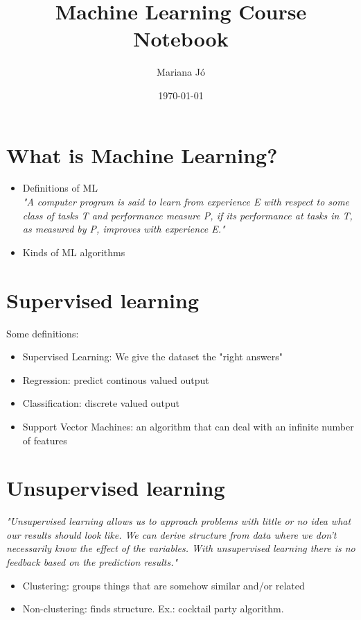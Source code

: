 \documentclass[a4paper,11pt]{article}
\title{Machine Learning Course\\\large{Notebook}}
\author{Mariana Jó}
\date{\today}
\begin{document}
  \maketitle
  \thispagestyle{fancy}


  \section{What is Machine Learning?}
  \begin{itemize}
    \item Definitions of ML \\
    \textit{"A computer program is said to learn from experience E with respect to some class of tasks T and performance measure P, if its performance at tasks in T, as measured by P, improves with experience E."}
    \item Kinds of ML algorithms
  \end{itemize}

  \section{Supervised learning}
  Some definitions:
  \begin{itemize}
    \item Supervised Learning: We give the dataset the "right answers"
    \item Regression: predict continous valued output
    \item Classification: discrete valued output
    \item Support Vector Machines: an algorithm that can deal with an infinite number of features
  \end{itemize}
  \section{Unsupervised learning}
  \textit{"Unsupervised learning allows us to approach problems with little or no idea what our results should look like. We can derive structure from data where we don't necessarily know the effect of the variables. With unsupervised learning there is no feedback based on the prediction results."}
  \begin{itemize}
    \item Clustering: groups things that are somehow similar and/or related
    \item Non-clustering: finds structure. Ex.: cocktail party algorithm.
  \end{itemize}
\end{document}
